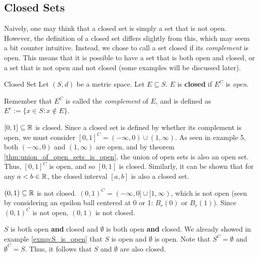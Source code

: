 \subsection{Closed Sets}
Naively, one may think that a closed set is simply a set that is not open. However, the definition of a closed set differs slightly from this, which may seem a bit counter intuitive. Instead, we chose to call a set closed if its \textit{complement} is open. This means that it is possible to have a set that is both open and closed, or a set that is not open and not closed (some examples will be discussed later).
\newline

\begin{defn}{Closed Set}{}
Let \((S, d)\) be a metric space. Let \(E \subseteq S\). \newline 
\(E\) is \textbf{closed} if \(E^C\) is \textit{open}.
\newline 

Remember that \(E^C\) is called the \textit{complement} of \(E\), and is defined as \(E^c := \{x \in S : x \not \in E\}\).
\end{defn}
\begin{exmp}{}{}
\([0, 1] \subseteq {\mathbb R}\) is closed. Since a closed set is defined by whether its complement is open, we must consider \([0,1]^C = (- \infty, 0) \cup (1,  \infty)\). As seen in example 5, both \((- \infty, 0)\) and \((1, \infty)\) are open, and by theorem \ref{thm:union_of_open_sets_is_open}, the union of open sets is also an open set. Thus, \([0,1]^C\) is open, and so \([0,1]\) is closed. Similarly, it can be shown that for any \(a<b \in {\mathbb R}\), the closed interval \([a,b]\) is also a closed set.
\end{exmp}
\begin{exmp}{}{}
\((0, 1) \subseteq {\mathbb R}\) is not closed. \((0, 1)^C = (-\infty, 0] \cup [1, \infty)\), which is not open (seen by considering an epsilon ball centered at 0 or 1: \(B_r(0)\) or \(B_r(1)\)). Since \((0, 1)^C\) is not open, \((0, 1)\) is not closed.
\end{exmp}
\begin{exmp}{}{}
\(S\) is both open \textbf{and} closed and \(\emptyset\) is both open \textbf{and} closed. We already showed in example \ref{exmp:S_is_open} that \(S\) is open and \(\emptyset\) is open. Note that \(S^C = \emptyset\) and \(\emptyset^C = S\). Thus, it follows that \(S\) and \(\emptyset\) are also closed.
\end{exmp}
